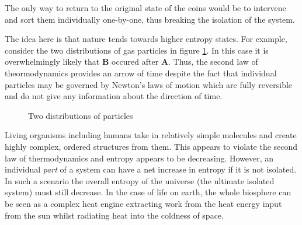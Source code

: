 \documentclass[main.tex]{subfiles}
\begin{document}
The only way to return to the original state of the coins would be to intervene and sort them individually one-by-one, thus breaking the isolation of the system.


The idea here is that nature tends towards higher entropy states. For example, consider the two distributions of gas particles in figure \ref{fig:gas-distrib}. In this case it is overwhelmingly likely that \textbf{B} occured after \textbf{A}. Thus, the second law of theormodynamics provides an arrow of time despite the fact that individual particles may be governed by Newton's laws of motion which are fully reversible and do not give any information about the direction of time.

\begin{figure}[ht]
  \begin{center}\end{center}
  \caption{Two distributions of particles}
  \label{fig:gas-distrib}
\end{figure}


Living organisms including humans take in relatively simple molecules and create highly complex, ordered structures from them. This appears to violate the second law of thermodynamics and entropy appears to be decreasing. However, an individual \emph{part} of a system can have a net increase in entropy if it is not isolated. In such a scenario the overall entropy of the universe (the ultimate isolated system) must still decrease. In the case of life on earth, the whole biosphere can be seen as a complex heat engine extracting work from the heat energy input from the sun whilst radiating heat into the coldness of space.
\end{document}
